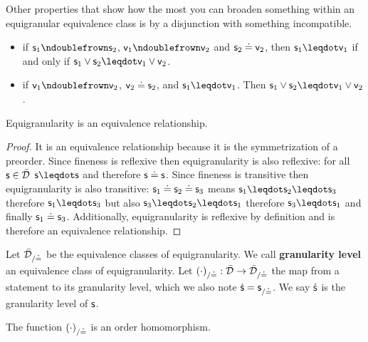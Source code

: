 \documentclass[10pt, onecolumn, longbibliography, nofootinbib]{revtex4-2}
\begin{document}
\begin{conj}
Other properties that show how the most you can broaden something within an equigranular equivalence class is by a disjunction with something incompatible.
	
\begin{itemize}
	\item if $\stmt_1 \ncomp \stmt_2$, $\stmt[v]_1 \ncomp \stmt[v]_2$ and $\stmt_2 \eqgran \stmt[v]_2$, then $\stmt_1 \finer \stmt[v]_1$ if and only if $\stmt_1 \OR \stmt_2 \finer \stmt[v]_1 \OR \stmt[v]_2$.
	
	\item if $\stmt[v]_1\ncomp\stmt[v]_2$, $\stmt[v]_2\eqgran\stmt_2$, and $\stmt_1\finer\stmt[v]_1$. Then $\stmt_1\OR\stmt_2\finer\stmt[v]_1\OR\stmt[v]_2$.
\end{itemize}

\end{conj}

\begin{prop}
    Equigranularity is an equivalence relationship.
\end{prop}

\begin{proof}
    It is an equivalence relationship because it is the symmetrization of a preorder. Since fineness is reflexive then equigranularity is also reflexive: for all $\stmt \in \tdomain$ $\stmt \finer \stmt$ and therefore $\stmt \eqgran \stmt$. Since fineness is transitive then equigranularity is also transitive: $\stmt_1 \eqgran \stmt_2 \eqgran \stmt_3$ means $\stmt_1 \finer \stmt_2 \finer \stmt_3$ therefore $\stmt_1 \finer \stmt_3$ but also $\stmt_3 \finer \stmt_2 \finer \stmt_1$ therefore $\stmt_3 \finer \stmt_1$ and finally $\stmt_1 \eqgran \stmt_3$. Additionally, equigranularity is reflexive by definition and is therefore an equivalence relationship.
\end{proof}

\begin{defn}
    Let $\tdomain_{/\eqgran}$ be the equivalence classes of equigranularity. We call \textbf{granularity level} an equivalence class of equigranularity. Let $(\cdot)_{/\eqgran} : \tdomain \to \tdomain_{/\eqgran}$ the map from a statement to its granularity level, which we also note $\dot{\stmt} = {\stmt}_{/\eqgran}$. We say $\dot{\stmt}$ is the granularity level of $\stmt$.
\end{defn}

\begin{prop}
    The function $(\cdot)_{/\eqgran}$ is an order homomorphism.
\end{prop}
\end{document}
